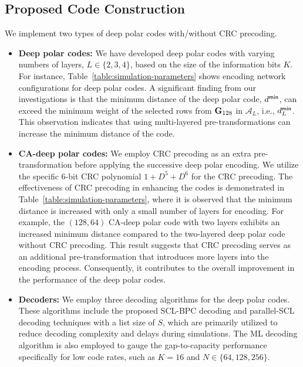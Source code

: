 \documentclass[conference]{IEEEtran}
\begin{document}
\subsection{Proposed Code Construction}
We implement two types of deep polar codes with/without CRC precoding.
\begin{itemize}

	\item {\bf Deep polar codes:}  	 We have developed deep polar codes with varying numbers of layers, $L \in \{2, 3, 4\}$, based on the size of the information bits $K$. For instance, Table~\ref{table:simulation-parameters} shows encoding network configurations for deep polar codes. A significant finding from our investigations is that the minimum distance of the deep polar code, $d^{\sf min}$, can exceed the minimum weight of the selected rows from ${\bf G}_{128}$ in $\mathcal{A}_L$, i.e., $d_{L}^{\sf min}$. This observation indicates that using multi-layered pre-transformations can increase the minimum distance of the code.
	 
	 
	 	    \item {\bf CA-deep polar codes:} We employ CRC precoding as an extra pre-transformation before applying the successive deep polar encoding. We utilize the specific 6-bit CRC polynomial $1 + D^5 + D^6$ for the CRC precoding. The effectiveness of CRC precoding in enhancing the codes is demonstrated in Table~\ref{table:simulation-parameters}, where it is observed that the minimum distance is increased with only a small number of layers for encoding. For example, the $(128,64)$ CA-deep polar code with two layers exhibits an increased minimum distance compared to the two-layered deep polar code without CRC precoding. This result suggests that CRC precoding serves as an additional pre-transformation that introduces more layers into the encoding process. Consequently, it contributes to the overall improvement in the performance of the deep polar codes.





	    
	    
	    \item {\bf Decoders:} We employ three decoding algorithms for the deep polar codes. These algorithms include the proposed SCL-BPC decoding and parallel-SCL decoding techniques with a list size of $S$, which are primarily utilized to reduce decoding complexity and delays during simulations. The ML decoding algorithm is also employed to gauge the gap-to-capacity performance specifically for low code rates, such as $K=16$ and $N\in \{64, 128, 256\}$.

\end{itemize}
\end{document}
